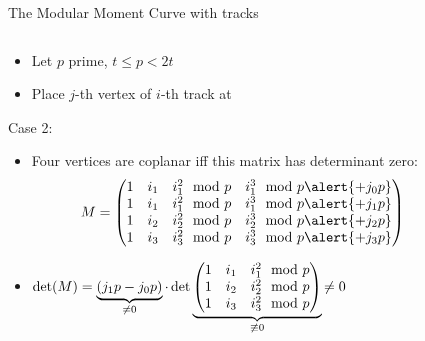 \documentclass[t]{beamer}
\begin{document}
\begin{frame}{The Modular Moment Curve with tracks}
    \vspace{-0.5cm}
    \begin{columns}
	\begin{column}{0.5\textwidth}
		\begin{itemize}
		    \item <+-> Let $p$ prime, $t\le p<2t$
		    \item
			Place $j$-th vertex of $i$-th track at  \\
			\end{itemize}
			Case 2: 
			\begin{itemize}
		    \item Four vertices are coplanar iff this matrix has determinant zero:
			\begin{equation*}
			    M = \begin{pmatrix}
				{1}&i_1&i_1^2\mod p&i_1^3\mod p \alert{+j_0p}\\
				{1}&i_1&i_1^2\mod p&i_1^3\mod p \alert{+j_1p}\\
				{1}&i_2&i_2^2\mod p&i_2^3\mod p \alert{+j_2p}\\
				{1}&i_3&i_3^2\mod p&i_3^3\mod p \alert{+j_3p}\\
			    \end{pmatrix}
			\end{equation*}
		    \item <+-> 
			\(\det(M) = \underbrace{(j_1p-j_0p)}_{\neq 0}\cdot\det
			    \underbrace{
				\begin{pmatrix}
				    {1}&i_1&i_1^2\mod p\\
				    {1}&i_2&i_2^2\mod p\\
				    {1}&i_3&i_3^2\mod p\\
				\end{pmatrix}
			    }_{\not\equiv0} \mathrlap{\neq 0}
			\)
		\end{itemize}
	\end{column}
	    \begin{column}{0.5\textwidth}
		\begin{center}
		\end{center}
	    \end{column}
    \end{columns}
\end{frame}
\end{document}
